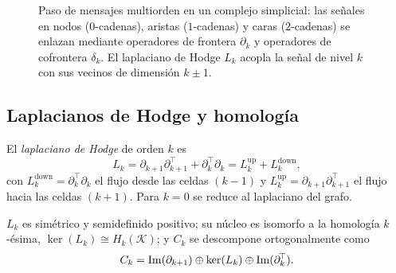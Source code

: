 \begin{figure}[ht]
\caption[Jerarqu\'ia simplicial]{Paso de mensajes multiorden en un complejo
simplicial: las se\~nales en nodos ($0$-cadenas), aristas ($1$-cadenas) y caras
($2$-cadenas) se enlazan mediante operadores de frontera $\partial_k$ y
operadores de cofrontera $\delta_k$. El laplaciano de Hodge $L_k$ acopla la
se\~nal de nivel $k$ con sus vecinos de dimensi\'on $k \pm 1$.}
\label{fig:gauge:simplicial-hierarchy}
\end{figure}

\subsection{Laplacianos de Hodge y homolog\'ia}
\label{sec:gauge:hodge}

\begin{definition}
\label{def:gauge:hodge-laplacian}
El \emph{laplaciano de Hodge} de orden $k$ es
\[
  L_k = \partial_{k+1}\partial_{k+1}^{\!\top} + \partial_k^{\!\top}\partial_k
      = L_k^{\text{up}} + L_k^{\text{down}},
\]
con $L_k^{\text{down}} = \partial_k^{\!\top}\partial_k$ el flujo desde las celdas
$(k-1)$ y $L_k^{\text{up}} = \partial_{k+1}\partial_{k+1}^{\!\top}$ el flujo hacia
las celdas $(k+1)$. Para $k = 0$ se reduce al laplaciano del grafo.
\end{definition}

\begin{theorem}
\label{thm:gauge:hodge-props}
$L_k$ es sim\'etrico y semidefinido positivo; su n\'ucleo es isomorfo a la
homolog\'ia $k$-\'esima, $\ker(L_k) \cong H_k(\mathcal{K})$; y $C_k$ se descompone
ortogonalmente como
\[
  C_k = \operatorname{Im}(\partial_{k+1}) \oplus \ker(L_k) \oplus \operatorname{Im}(\partial_k^{\!\top}).
\]
\end{theorem}

